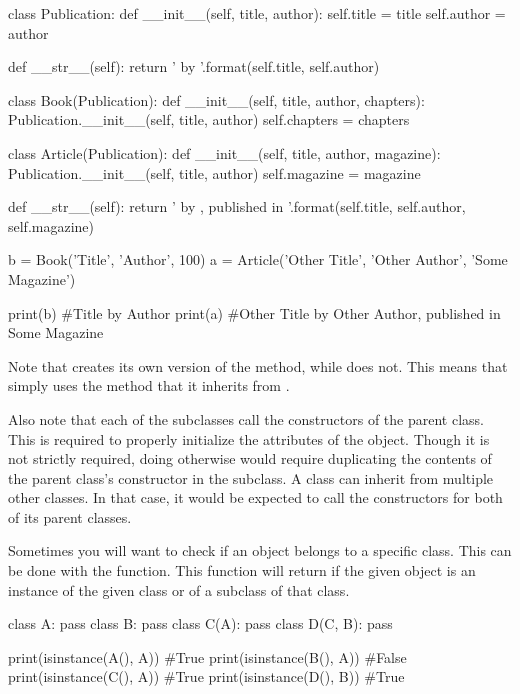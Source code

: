 \documentclass[11pt]{cselabheader}
\begin{document}
\begin{python3code}
class Publication:
    def __init__(self, title, author):
        self.title = title
        self.author = author

    def __str__(self):
        return '{} by {}'.format(self.title, self.author)

class Book(Publication):
    def __init__(self, title, author, chapters):
        Publication.__init__(self, title, author)
        self.chapters = chapters

class Article(Publication):
    def __init__(self, title, author, magazine):
        Publication.__init__(self, title, author)
        self.magazine = magazine

    def __str__(self):
        return '{} by {}, published in {}'.format(self.title, self.author,
            self.magazine)

b = Book('Title', 'Author', 100)
a = Article('Other Title', 'Other Author', 'Some Magazine')

print(b) #Title by Author
print(a) #Other Title by Other Author, published in Some Magazine
\end{python3code}

Note that  creates its own version of the
 method, while  does not. This means
that  simply uses the method that it inherits from
.

Also note that each of the subclasses call the constructors of the parent class.
This is required to properly initialize the attributes of the object. Though it
is not strictly required, doing otherwise would require duplicating the
contents of the parent class's constructor in the subclass. A class can inherit
from multiple other classes. In that case, it would be expected to call the
constructors for both of its parent classes.

Sometimes you will want to check if an object belongs to a specific class. This
can be done with the  function. This function will
return  if the given object is an instance of the given class
or of a subclass of that class.

\begin{python3code}
class A:
    pass
class B:
    pass
class C(A):
    pass
class D(C, B):
    pass

print(isinstance(A(), A)) #True
print(isinstance(B(), A)) #False
print(isinstance(C(), A)) #True
print(isinstance(D(), B)) #True
\end{python3code}
\end{document}
